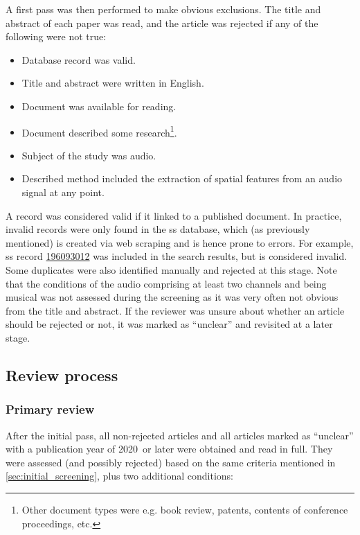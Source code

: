 \documentclass[referee,pdflatex,sn-mathphys-num]{sn-jnl}%
\newcommand{\publicationcutoff}{2020}
\newcommand{\q}[1]{\enquote{#1}}
\begin{document}
A first pass was then performed to make obvious exclusions. The title and abstract of each paper was read, and the article was rejected if any of the following were not true:

\begin{itemize}
    \item Database record was valid.
    \item Title and abstract were written in English.
    \item Document was available for reading.
    \item Document described some research\footnote{Other document types were e.g. book review, patents, contents of conference proceedings, etc.}.
    \item Subject of the study was audio.
    \item Described method included the extraction of spatial features from an audio signal at any point.
\end{itemize}

A record was considered valid if it linked to a published document. In practice, invalid records were only found in the \gls{ss} database, which (as previously mentioned) is created via web scraping and is hence prone to errors. For example, \gls{ss} record \href{https://api.semanticscholar.org/CorpusID:196093012}{196093012} was included in the search results, but is considered invalid. Some duplicates were also identified manually and rejected at this stage. Note that the conditions of the audio comprising at least two channels and being musical was not assessed during the screening as it was very often not obvious from the title and abstract. If the reviewer was unsure about whether an article should be rejected or not, it was marked as \q{unclear} and revisited at a later stage.

\subsection{Review process}
\label{sec:full_assessment}

\subsubsection{Primary review}
\label{sec:primary_review}
After the initial pass, all non-rejected articles and all articles marked as \q{unclear} with a publication year of \publicationcutoff~or later were obtained and read in full. They were assessed (and possibly rejected) based on the same criteria mentioned in \cref{sec:initial_screening}, plus two additional conditions:
\end{document}
